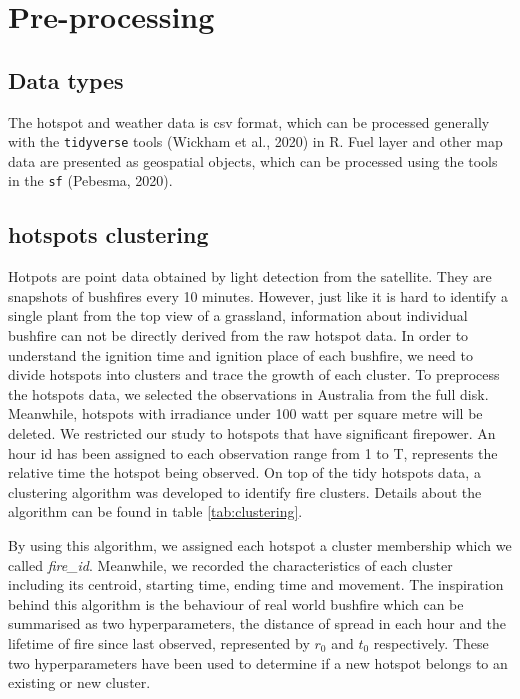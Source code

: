 \documentclass{monashthesis}
\begin{document}
\section{Pre-processing}\label{pre-processing}

\subsection{Data types}\label{data-types}

The hotspot and weather data is csv format, which can be processed
generally with the \texttt{tidyverse} tools (Wickham et al., 2020) in R.
Fuel layer and other map data are presented as geospatial objects, which
can be processed using the tools in the \texttt{sf} (Pebesma, 2020).

\subsection{hotspots clustering}\label{hotspots-clustering}

Hotpots are point data obtained by light detection from the satellite.
They are snapshots of bushfires every 10 minutes. However, just like it
is hard to identify a single plant from the top view of a grassland,
information about individual bushfire can not be directly derived from
the raw hotspot data. In order to understand the ignition time and
ignition place of each bushfire, we need to divide hotspots into
clusters and trace the growth of each cluster. To preprocess the
hotspots data, we selected the observations in Australia from the full
disk. Meanwhile, hotspots with irradiance under 100 watt per square
metre will be deleted. We restricted our study to hotspots that have
significant firepower. An hour id has been assigned to each observation
range from 1 to T, represents the relative time the hotspot being
observed. On top of the tidy hotspots data, a clustering algorithm was
developed to identify fire clusters. Details about the algorithm can be
found in table \ref{tab:clustering}.

By using this algorithm, we assigned each hotspot a cluster membership
which we called \emph{fire\_id}. Meanwhile, we recorded the
characteristics of each cluster including its centroid, starting time,
ending time and movement. The inspiration behind this algorithm is the
behaviour of real world bushfire which can be summarised as two
hyperparameters, the distance of spread in each hour and the lifetime of
fire since last observed, represented by \(r_0\) and \(t_0\)
respectively. These two hyperparameters have been used to determine if a
new hotspot belongs to an existing or new cluster.
\end{document}
